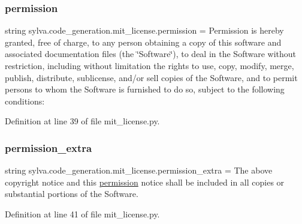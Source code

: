 \subsubsection{\texorpdfstring{permission}{permission}}
{\footnotesize\ttfamily string sylva.\+code\+\_\+generation.\+mit\+\_\+license.\+permission = \textquotesingle{}Permission is hereby granted, free of charge, to any person obtaining a copy of this software and associated documentation files (the \char`\"{}Software\char`\"{}), to deal in the Software without restriction, including without limitation the rights to use, copy, modify, merge, publish, distribute, sublicense, and/or sell copies of the Software, and to permit persons to whom the Software is furnished to do so, subject to the following conditions\+:\textquotesingle{}}



Definition at line 39 of file mit\+\_\+license.\+py.

\mbox{\label{namespacesylva_1_1code__generation_1_1mit__license_ae51b5f9d271cf247681c95af29079e5a}} 
\subsubsection{\texorpdfstring{permission\+\_\+extra}{permission\_extra}}
{\footnotesize\ttfamily string sylva.\+code\+\_\+generation.\+mit\+\_\+license.\+permission\+\_\+extra = \textquotesingle{}The above copyright notice and this \hyperlink{namespacesylva_1_1code__generation_1_1mit__license_af67ea5ac7bf8aeac183aefb908f601e2}{permission} notice shall be included in all copies or substantial portions of the Software.\textquotesingle{}}



Definition at line 41 of file mit\+\_\+license.\+py.

\mbox{\label{namespacesylva_1_1code__generation_1_1mit__license_a56cd97ae81f6c650978da8a12f279175}} 
